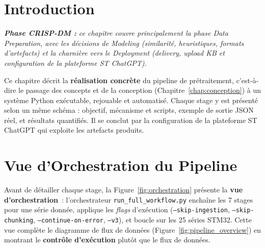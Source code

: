 \documentclass[12pt,a4paper]{report}
\begin{document}
\section*{Introduction}

\textit{\small\textbf{\textcolor{stblue}{Phase CRISP-DM :}} ce chapitre couvre principalement la phase \textit{Data Preparation}, avec les décisions de \textit{Modeling} (similarité, heuristiques, formats d'artefacts) et la charnière vers le \textit{Deployment} (delivery, upload KB et configuration de la plateforme ST ChatGPT).}\par\smallskip

Ce chapitre décrit la \textbf{réalisation concrète} du pipeline de prétraitement, c'est-à-dire le passage des concepts et de la conception (Chapitre~\ref{chap:conception}) à un système Python exécutable, rejouable et automatisé. Chaque stage y est présenté selon un même schéma : objectif, mécanisme et scripts, exemple de sortie JSON réel, et résultats quantifiés. Il se conclut par la configuration de la plateforme ST ChatGPT qui exploite les artefacts produits.

\section{Vue d'Orchestration du Pipeline}
\label{sec:orchestration_pipeline}

Avant de détailler chaque stage, la Figure~\ref{fig:orchestration} présente la \textbf{vue d'orchestration}~: l'orchestrateur \texttt{run\_full\_workflow.py} enchaîne les 7 stages pour une série donnée, applique les \textit{flags} d'exécution (\texttt{--skip-ingestion}, \texttt{--skip-chunking}, \texttt{--continue-on-error}, \texttt{--v3}), et boucle sur les 25 séries STM32. Cette vue complète le diagramme de flux de données (Figure~\ref{fig:pipeline_overview}) en montrant le \textbf{contrôle d'exécution} plutôt que le flux de données.
\end{document}
